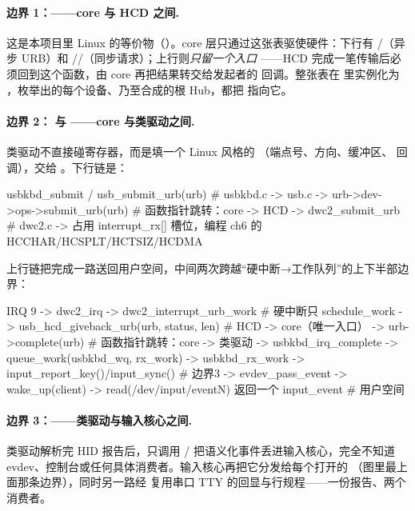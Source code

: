 \paragraph{边界 1：——core 与 HCD 之间.}
这是本项目里 Linux  的等价物（）。core 层只通过这张表驱使硬件：下行有 /（异步 URB）和 //（同步请求）；上行则\emph{只留一个入口} ——HCD 完成一笔传输后必须回到这个函数，由 core 再把结果转交给发起者的  回调。整张表在  里实例化为 ，枚举出的每个设备、乃至合成的根 Hub，都把  指向它。

\paragraph{边界 2： 与 ——core 与类驱动之间.}
类驱动不直接碰寄存器，而是填一个 Linux 风格的 （端点号、方向、缓冲区、 回调），交给 。下行链是：

\begin{txtcode}
usbkbd_submit / usb_submit_urb(urb)          # usbkbd.c -> usb.c
  -> urb->dev->ops->submit_urb(urb)          # 函数指针跳转：core -> HCD
     -> dwc2_submit_urb                      # dwc2.c
        -> 占用 interrupt_rx[] 槽位，编程 ch6 的 HCCHAR/HCSPLT/HCTSIZ/HCDMA
\end{txtcode}

上行链把完成一路送回用户空间，中间两次跨越“硬中断→工作队列”的上下半部边界：

\begin{txtcode}
IRQ 9 -> dwc2_irq -> dwc2_interrupt_urb_work # 硬中断只 schedule_work
  -> usb_hcd_giveback_urb(urb, status, len)  # HCD -> core（唯一入口）
     -> urb->complete(urb)                   # 函数指针跳转：core -> 类驱动
        -> usbkbd_irq_complete -> queue_work(usbkbd_wq, rx_work)
           -> usbkbd_rx_work -> input_report_key()/input_sync()   # 边界3
              -> evdev_pass_event -> wake_up(client)
                 -> read(/dev/input/eventN) 返回一个 input_event   # 用户空间
\end{txtcode}

\paragraph{边界 3：——类驱动与输入核心之间.}
类驱动解析完 HID 报告后，只调用 / 把语义化事件丢进输入核心，完全不知道 evdev、控制台或任何具体消费者。输入核心再把它分发给每个打开的 （图里最上面那条边界），同时另一路经  复用串口 TTY 的回显与行规程——一份报告、两个消费者。

